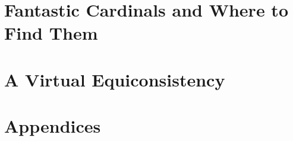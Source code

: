 




\frontmatter





\setcounter{tocdepth}{2}
\tableofcontents
\thispagestyle{fancy}






\mainmatter

\newpage\part{Fantastic Cardinals and Where to Find Them}





\newpage\part{A Virtual Equiconsistency}









\newpage\part{Appendices}
\appendix







\backmatter
\pagestyle{fancy}

\nocite{*}



